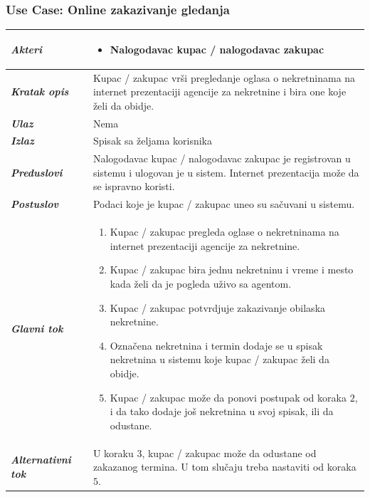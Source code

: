 \documentclass[20pt]{article}
\begin{document}
\subsubsection{\bfseries \large Use Case: Online zakazivanje gledanja}
\begin{center}
\begin{tabular}{p{0.23\linewidth} p{0.77\linewidth}}
 \hline
 {\it \bfseries Akteri} & \begin{itemize}
    \item Nalogodavac kupac / nalogodavac zakupac
\end{itemize}\\
\hline

 {\it \bfseries Kratak opis} & Kupac / zakupac vr\v si pregledanje oglasa o nekretninama na internet prezentaciji agencije za nekretnine i bira one koje \v zeli da obidje.\\ 
 \hline
 
 {\it \bfseries Ulaz} & Nema\\ 
 \hline
 
 {\it \bfseries Izlaz} & Spisak sa \v zeljama korisnika\\
 \hline
 
 {\it \bfseries Preduslovi} & Nalogodavac kupac / nalogodavac zakupac je registrovan u sistemu i ulogovan je u sistem. Internet prezentacija mo\v ze da se ispravno koristi.\\
 \hline

 {\it \bfseries Postuslov} & Podaci koje je kupac / zakupac uneo su sa\v cuvani u sistemu.\\
 \hline

     {\it \bfseries Glavni tok} &  
     \begin{enumerate}
         \item  Kupac / zakupac pregleda oglase o nekretninama na internet prezentaciji agencije za nekretnine.
         \item  Kupac / zakupac bira jednu nekretninu i vreme i mesto kada \v zeli da je pogleda u\v zivo sa agentom.
         \item  Kupac / zakupac potvrdjuje zakazivanje obilaska nekretnine.
         \item  Označena nekretnina i termin dodaje se u spisak nekretnina u sistemu koje kupac / zakupac želi da obidje.
         \item  Kupac / zakupac mo\v ze da ponovi postupak od koraka $2$, i da tako dodaje jo\v s nekretnina u svoj spisak, ili da odustane.
    \end{enumerate}\\
 \hline

 {\it \bfseries Alternativni tok} & U koraku 3, kupac / zakupac mo\v ze da odustane od zakazanog termina. U tom slu\v caju treba nastaviti od koraka $5$.\\
 \hline
 
\end{tabular}
\end{center}
\end{document}
